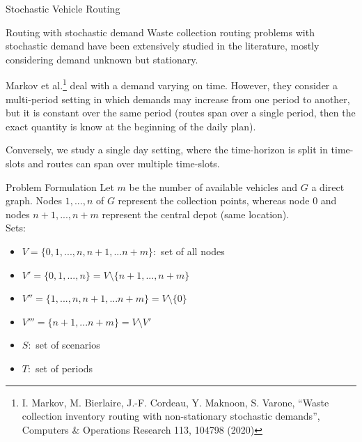 \documentclass{beamer} %
\theoremstyle{definition} %
\begin{document}
    \begin{frame}{Stochastic Vehicle Routing}
  	\begin{block}{Routing with stochastic demand}
  	Waste collection routing problems with stochastic demand have been extensively	studied in the literature, mostly considering demand unknown but stationary. 
  	
  	Markov et al.\footnote{ I. Markov, M. Bierlaire, J.-F. Cordeau, Y. Maknoon, S. Varone, ``Waste collection inventory	routing with non-stationary stochastic demands'', Computers \& Operations Research 113, 104798 (2020)} deal with a demand varying on time. However, they consider a multi-period setting in which demands
  	may increase from one period to another, but it is constant over the same period (routes span over a single period, then the exact quantity is know at the beginning of the daily plan). 
  	
  	Conversely, we study a single day setting, where the time-horizon is
  	split in time-slots and routes can span over multiple time-slots. 
  	\end{block}
  \end{frame}
  

\begin{frame}{Problem Formulation}
Let $m$ be the number of available vehicles and $G$ a direct graph. Nodes $1,...,n$ of $G$ represent the collection points, whereas node $0$ and nodes $n+1,...,n+m$ represent the central depot (same location). 
\vspace{0.2cm}\\
Sets:
\begin{itemize}
	\item $V=\{0,1,...,n,n+1,...n+m\}:$ set of all nodes
	\item $V'=\{0,1,...,n\}=V\setminus\{n+1,...,n+m\}$ 
	\item $V''=\{1,...,n,n+1,...n+m\}=V\setminus\{0\}$ 
	\item $V'''=\{n+1,...n+m\}=V\setminus V'$ 
	\item $S:$ set of scenarios
	\item $T:$ set of periods
\end{itemize}
	
\end{frame}
\end{document}
